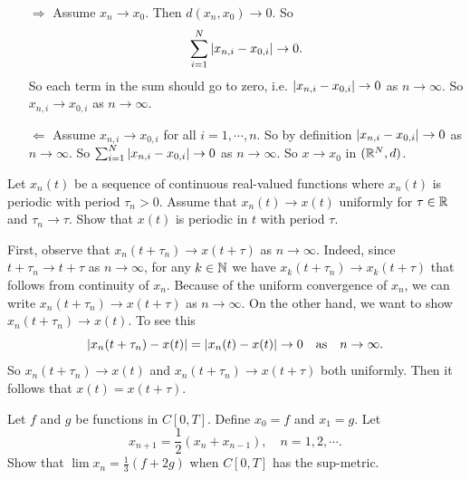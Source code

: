 \begin{solution}
	\begin{enumerate}[(a)]
		\item [$ \boxed{\Rightarrow}$] Assume $ x_n\to x_0 $. Then $ d(x_n,x_0) \to 0 $. So 
		\[ \sum_{i=1}^{N} |x_{n,i} - x_{0,i}| \to 0. \]
		So each term in the sum should go to zero, i.e. $ |x_{n,i}-x_{0,i}|\to 0 $ as $ n\to\infty $. So $ x_{n,i}\to x_{0,i} $ as $ n\to\infty $.
		
		\item [$\boxed{\Leftarrow}$] Assume $ x_{n,i}\to x_{0,i} $ for all $ i=1,\cdots, n $. So by definition $ |x_{n,i}-x_{0,i}|\to 0 $ as $ n\to\infty $. So $ \sum_{i=1}^{N}|x_{n,i}-x_{0,i}| \to 0 $ as $ n\to\infty $. So $ x \to x_0 $ in $ (\mathbb{R}^N, d) $.
	\end{enumerate}
\end{solution}


\begin{problem}
	Let $ x_n(t) $ be a sequence of continuous real-valued functions where $ x_n(t) $ is periodic with period $ \tau_n >0 $. Assume that $ x_n(t) \to x(t) $ uniformly for $ \tau\in \mathbb{R} $ and $ \tau_n\to\tau $. Show that $ x(t) $ is periodic in $ t $ with period $ \tau $. 
\end{problem}
\begin{solution}
	First, observe that $ x_n(t+\tau_n) \to x(t+\tau) $ as $ n\to\infty $. Indeed, since $ t+\tau_n\to t+\tau $ as $ n\to\infty $, for any $ k\in \mathbb{N} $ we have $ x_k(t+\tau_n) \to x_k(t+\tau) $ that follows from continuity of $ x_n $. Because of the uniform convergence of $ x_n $, we can write $ x_n(t+\tau_n)\to x(t+\tau) $ as $ n\to\infty $. On the other hand, we want to show $ x_n(t+\tau_n) \to x(t) $. To see this 
	\[ |x_n(t+\tau_n) - x(t)| = |x_n(t)-x(t)| \to 0 \quad \text{as} \quad n\to\infty. \]
	So $ x_n(t+\tau_n)\to x(t) $ and $ x_n(t+\tau_n)\to x(t+\tau) $ both uniformly. Then it follows that $ x(t) = x(t+\tau) $.
\end{solution}


\begin{problem}
	Let $ f $ and $ g $ be functions in $ C[0,T] $. Define $ x_0 = f $ and $ x_1 = g $. Let
	\[ x_{n+1} = \frac{1}{2}(x_n+x_{n-1}), \quad n = 1,2,\cdots. \]
	Show that $ \lim x_n = \frac{1}{3}(f+2g) $ when $ C[0,T] $ has the sup-metric.
\end{problem}

